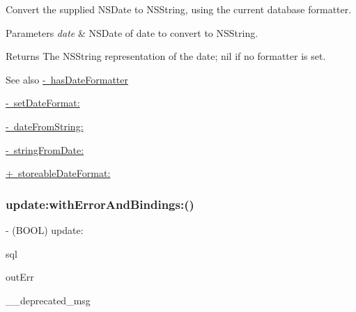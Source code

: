 Convert the supplied N\+S\+Date to N\+S\+String, using the current database formatter.


\begin{DoxyParams}{Parameters}
{\em date} & {\ttfamily N\+S\+Date} of date to convert to {\ttfamily N\+S\+String}.\\
\hline
\end{DoxyParams}
\begin{DoxyReturn}{Returns}
The {\ttfamily N\+S\+String} representation of the date; {\ttfamily nil} if no formatter is set.
\end{DoxyReturn}
\begin{DoxySeeAlso}{See also}
\mbox{\hyperlink{interface_o_p_t_l_y_f_m_d_b_database_a820a1ababb4c5496800b9bcd5f2de784}{-\/ has\+Date\+Formatter}} 

\mbox{\hyperlink{interface_o_p_t_l_y_f_m_d_b_database_a48c1936bc68ddd11cea9aa177b0cc94e}{-\/ set\+Date\+Format\+:}} 

\mbox{\hyperlink{interface_o_p_t_l_y_f_m_d_b_database_a5368268fe8e6d881d0da4d3538607768}{-\/ date\+From\+String\+:}} 

\mbox{\hyperlink{interface_o_p_t_l_y_f_m_d_b_database_a60793c2b214e29c00143fdf9510837d7}{-\/ string\+From\+Date\+:}} 

\mbox{\hyperlink{interface_o_p_t_l_y_f_m_d_b_database_acb3eef48cd21dcb11407b88dac662c57}{+ storeable\+Date\+Format\+:}} 
\end{DoxySeeAlso}
\mbox{\label{interface_o_p_t_l_y_f_m_d_b_database_a704a87863281b6dc997a9b31d09565ac}} 
\subsubsection{\texorpdfstring{update\+:with\+Error\+And\+Bindings\+:()}{update:withErrorAndBindings:()}}
{\footnotesize\ttfamily -\/ (B\+O\+OL) update\+: \begin{DoxyParamCaption}\item[{(N\+S\+String $\ast$)}]{sql }\item[{withErrorAndBindings:(N\+S\+Error $\ast$\+\_\+\+Nullable $\ast$)}]{out\+Err }\item[{,(\char`\"{}Use \mbox{\hyperlink{interface_o_p_t_l_y_f_m_d_b_database_a1281526ad6641e7ef2198c3e9d971754}{execute\+Update\+:with\+Error\+And\+Bindings\+:}} instead\char`\"{})}]{\+\_\+\+\_\+deprecated\+\_\+msg }\end{DoxyParamCaption}}

